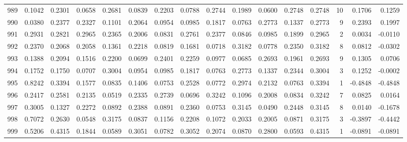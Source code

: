 \begin{tabular}{lrrrrrrrrrrrrrrr}
989 &      0.1042 &  0.2301 &  0.0658 &  0.2681 &  0.0839 &  0.2203 &  0.0788 &  0.2744 &  0.1989 &  0.0600 &   0.2748 &     0.2748 &     10 &                    0.1706 &                     0.1259 \\
990 &      0.0380 &  0.2377 &  0.2327 &  0.1101 &  0.2064 &  0.0954 &  0.0985 &  0.1817 &  0.0763 &  0.2773 &   0.1337 &     0.2773 &      9 &                    0.2393 &                     0.1997 \\
991 &      0.2931 &  0.2821 &  0.2965 &  0.2365 &  0.2006 &  0.0831 &  0.2761 &  0.2377 &  0.0846 &  0.0985 &   0.1899 &     0.2965 &      2 &                    0.0034 &                    -0.0110 \\
992 &      0.2370 &  0.2068 &  0.2058 &  0.1361 &  0.2218 &  0.0819 &  0.1681 &  0.0718 &  0.3182 &  0.0778 &   0.2350 &     0.3182 &      8 &                    0.0812 &                    -0.0302 \\
993 &      0.1388 &  0.2094 &  0.1516 &  0.2200 &  0.0699 &  0.2401 &  0.2259 &  0.0977 &  0.0685 &  0.2693 &   0.1961 &     0.2693 &      9 &                    0.1305 &                     0.0706 \\
994 &      0.1752 &  0.1750 &  0.0707 &  0.3004 &  0.0954 &  0.0985 &  0.1817 &  0.0763 &  0.2773 &  0.1337 &   0.2344 &     0.3004 &      3 &                    0.1252 &                    -0.0002 \\
995 &      0.8242 &  0.3394 &  0.1577 &  0.0835 &  0.1406 &  0.0753 &  0.2528 &  0.0772 &  0.2974 &  0.2132 &   0.0763 &     0.3394 &      1 &                   -0.4848 &                    -0.4848 \\
996 &      0.2417 &  0.2581 &  0.2135 &  0.0519 &  0.2335 &  0.2739 &  0.0696 &  0.3242 &  0.1096 &  0.2008 &   0.0834 &     0.3242 &      7 &                    0.0825 &                     0.0164 \\
997 &      0.3005 &  0.1327 &  0.2272 &  0.0892 &  0.2388 &  0.0891 &  0.2360 &  0.0753 &  0.3145 &  0.0490 &   0.2448 &     0.3145 &      8 &                    0.0140 &                    -0.1678 \\
998 &      0.7072 &  0.2630 &  0.0548 &  0.3175 &  0.0837 &  0.1156 &  0.2208 &  0.1072 &  0.2033 &  0.2005 &   0.0871 &     0.3175 &      3 &                   -0.3897 &                    -0.4442 \\
999 &      0.5206 &  0.4315 &  0.1844 &  0.0589 &  0.3051 &  0.0782 &  0.3052 &  0.2074 &  0.0870 &  0.2800 &   0.0593 &     0.4315 &      1 &                   -0.0891 &                    -0.0891 \\
\bottomrule
\end{tabular}
